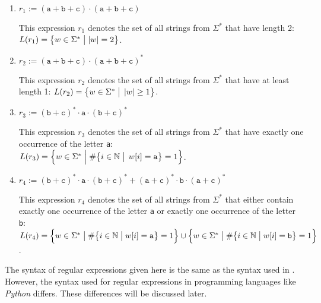 \begin{enumerate}
\item $ r_1 := (\texttt{a} + \texttt{b} + \texttt{c}) \cdot (\texttt{a} + \texttt{b} + \texttt{c}) $

      This expression $ r_1 $ denotes the set of all strings from $\Sigma^*$ that have length 2:
      \\[0.2cm]
      \hspace*{1.3cm}
      $ L(r_1) = \bigl\{ w \in \Sigma^* \bigm| |w| = 2 \bigr\}$.
\item $ r_2 := (\texttt{a} + \texttt{b} + \texttt{c}) \cdot (\texttt{a} + \texttt{b} + \texttt{c})^* $

      This expression $ r_2 $ denotes the set of all strings from $\Sigma^*$ that have at least length 1:
      $L(r_2) = \bigl\{ w \in \Sigma^* \bigm|\, |w| \geq 1 \bigr\}$.
\item $ r_3 := (\texttt{b} + \texttt{c})^* \cdot \texttt{a} \cdot (\texttt{b} + \texttt{c})^* $

      This expression $ r_3 $ denotes the set of all strings from $\Sigma^*$ that have exactly one occurrence of the letter \texttt{a}:
      \\[0.2cm]
      \hspace*{1.3cm}
      $L(r_3) = \Bigl\{ w \in \Sigma^* \Bigm| \#\bigl\{i \in \mathbb{N} \bigm|\, w[i] = \texttt{a} \bigr\} = 1 \Bigr\}$. 
\item $ r_4 :=  (\texttt{b} + \texttt{c})^* \cdot \texttt{a} \cdot (\texttt{b} + \texttt{c})^* + (\texttt{a} + \texttt{c})^* \cdot \texttt{b} \cdot (\texttt{a} + \texttt{c})^* $

      This expression $ r_4 $ denotes the set of all strings from $\Sigma^*$ that either contain exactly one
      occurrence of the letter \texttt{a} or exactly one occurrence of the letter \texttt{b}: 
      \\[0.2cm]
      \hspace*{1.3cm}
      $L(r_4) = \Bigl\{ w \in \Sigma^* \bigm| \#\bigl\{i \in \mathbb{N} \bigm| w[i] = \texttt{a} \bigr\} = 1
      \Bigr\} \cup \Bigl\{ w \in \Sigma^* \bigm| \#\bigl\{i \in \mathbb{N} \bigm| w[i] = \texttt{b} \bigr\} = 1
      \Bigr\}$.  \eox
\end{enumerate}

\remarkEng
The syntax of regular expressions given here is the same as the syntax used in \cite{hopcroft:06}. However, the
syntax used for regular expressions in programming languages like \textsl{Python} differs. These differences
will be discussed later. 
\eox


